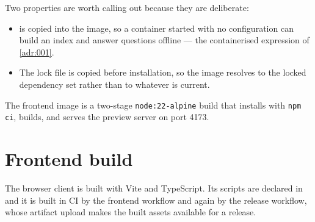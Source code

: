 Two properties are worth calling out because they are deliberate:

\begin{itemize}[nosep]
  \item {} is copied into the image, so a container started with
    no configuration can build an index and answer questions offline --- the
    containerised expression of \cref{adr:001}.
  \item The lock file is copied before installation, so the image resolves to
    the locked dependency set rather than to whatever is current.
\end{itemize}

The frontend image is a two-stage \texttt{node:22-alpine} build that installs
with \texttt{npm ci}, builds, and serves the preview server on port 4173.

\section{Frontend build}

The browser client is built with Vite and TypeScript. Its scripts are declared
in  and it is built in CI by the frontend
workflow and again by the release workflow, whose artifact upload makes the
built assets available for a release.
